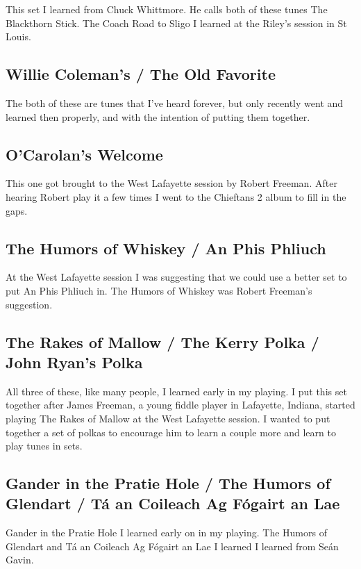 \documentclass[9pt,letterpaper]{article}
\begin{document}
{This set I learned from Chuck Whittmore. He calls both of these tunes The Blackthorn Stick. The Coach Road to Sligo I learned at the Riley's session in St Louis.

\subsection{Willie Coleman's / The Old Favorite}

The  both of these are tunes that I've heard forever, but only recently went and learned then properly, and with the intention of putting them together.

\subsection{O'Carolan's Welcome}

This one got brought to the West Lafayette session by Robert Freeman. After hearing Robert play it a few times I went to the Chieftans 2 album to fill in the gaps.

\subsection{The Humors of Whiskey / An Phis Phliuch}

At the West Lafayette session I was suggesting that we could use a better set to put An Phis Phliuch in. The Humors of Whiskey was Robert Freeman's suggestion. 

\subsection{The Rakes of Mallow / The Kerry Polka / John Ryan's Polka}

All three of these, like many people, I learned early in my playing. I put this set together after James Freeman, a young fiddle player in Lafayette, Indiana, started playing The Rakes of Mallow at the West Lafayette session. I wanted to put together a set of polkas to encourage him to learn a couple more and learn to play tunes in sets.

\subsection{Gander in the Pratie Hole / The Humors of Glendart / Tá an Coileach Ag Fógairt an Lae}

Gander in the Pratie Hole I learned early on in my playing. The Humors of Glendart and Tá an Coileach Ag Fógairt an Lae I learned I learned from Seán Gavin.

}
\end{document}
